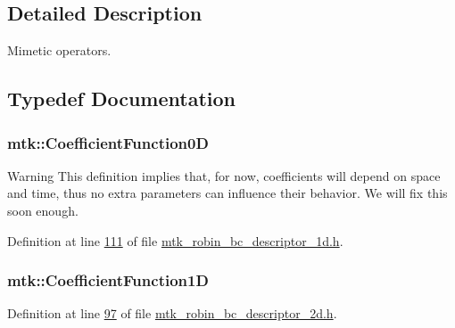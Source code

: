 \subsection{Detailed Description}
Mimetic operators. 

\subsection{Typedef Documentation}
\hypertarget{group__c07-mim__ops_ga04276745b4d511f0f3c636d6e0df7c2d}{
\subsubsection[{Coefficient\+Function0\+D}]{\setlength{\rightskip}{0pt plus 5cm}mtk\+::\+Coefficient\+Function0\+D}}\label{group__c07-mim__ops_ga04276745b4d511f0f3c636d6e0df7c2d}
\begin{DoxyWarning}{Warning}
This definition implies that, for now, coefficients will depend on space and time, thus no extra parameters can influence their behavior. We will fix this soon enough. 
\end{DoxyWarning}


Definition at line \hyperlink{mtk__robin__bc__descriptor__1d_8h_source_l00111}{111} of file \hyperlink{mtk__robin__bc__descriptor__1d_8h_source}{mtk\+\_\+robin\+\_\+bc\+\_\+descriptor\+\_\+1d.\+h}.

\hypertarget{group__c07-mim__ops_gaa79593eeb6676d6011db339e01983909}{
\subsubsection[{Coefficient\+Function1\+D}]{\setlength{\rightskip}{0pt plus 5cm}mtk\+::\+Coefficient\+Function1\+D}}\label{group__c07-mim__ops_gaa79593eeb6676d6011db339e01983909}


Definition at line \hyperlink{mtk__robin__bc__descriptor__2d_8h_source_l00097}{97} of file \hyperlink{mtk__robin__bc__descriptor__2d_8h_source}{mtk\+\_\+robin\+\_\+bc\+\_\+descriptor\+\_\+2d.\+h}.

